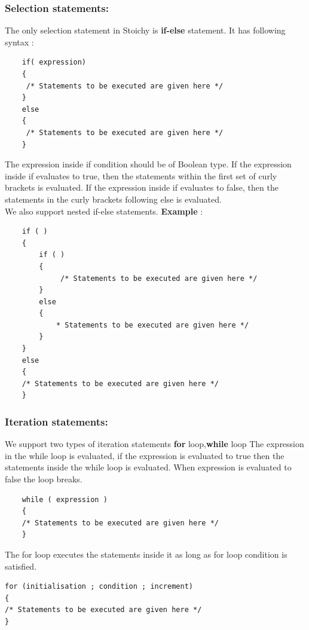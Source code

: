 \documentclass[english,a4paper,12pt]{report}
\begin{document}
\subsubsection{Selection statements:} 
The only selection statement in Stoichy is \textbf{if-else} statement. It has following syntax : \newline
\begin{verbatim}
    if( expression)
    {  
     /* Statements to be executed are given here */ 
    }
    else
    { 
     /* Statements to be executed are given here */ 
    }
\end{verbatim}
The expression inside if condition should be of Boolean type. If the expression inside if evaluates to true, then the
statements within the first set of curly brackets is evaluated. If the expression inside if evaluates to false,
then the statements in the curly brackets following else is evaluated.\\
We also support nested if-else statements.
\newpage
\vspace{0.5cm}
\textbf{Example }:\\
\begin{verbatim}
    if ( )
    { 
        if ( )
        {
             /* Statements to be executed are given here */ 
        }
        else
        {
            * Statements to be executed are given here */ 
        } 
    } 
    else
    {
    /* Statements to be executed are given here */ 
    }
\end{verbatim}
\subsubsection{Iteration statements:}
We support two types of iteration statements \textbf{for} loop,\textbf{while} loop \newline
The expression in the while loop is evaluated, if the expression is evaluated to true then the statements inside the while loop is evaluated. When expression is evaluated to false the loop breaks.\\
\begin{verbatim}
    while ( expression ) 
    { 
    /* Statements to be executed are given here */ 
    }
\end{verbatim}
\vspace{1cm}
The for loop executes the statements inside it as long as for loop condition is satisfied.\\
\begin{verbatim}
for (initialisation ; condition ; increment)
{ 
/* Statements to be executed are given here */ 
}
\end{verbatim}
 \newpage
\end{document}
